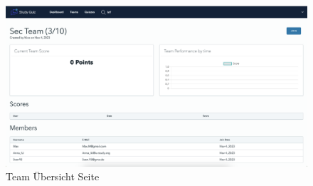 \begin{figure}[H]
  \includegraphics[width=\linewidth]{img/team-detail.png}
  \caption{Team Übersicht Seite}
  \label{fig:team}
\end{figure}
